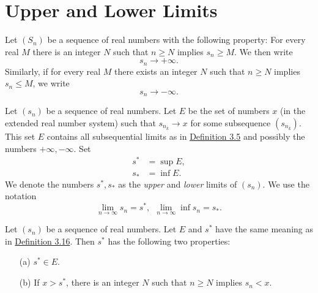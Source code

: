 \documentclass[11pt,a4paper]{book}
\begin{document}
\section{Upper and Lower Limits}

\begin{definition}[3.15]
    Let \( ({S}_{n}) \) be a sequence of real numbers with the following property: For every real \( M  \) there is an integer \( N \) such that \( n \geq N  \) implies \( {s}_{n} \geq M  \). We then write
    \[  {s}_{n} \to + \infty.  \]
    Similarly, if for every real \( M  \) there exists an integer \( N  \) such that \( n \geq N  \) implies \( {s}_{n} \leq M   \), we write
    \[  {s}_{n} \to -\infty.  \]
\end{definition}

\begin{definition}[3.16]\label{3.16}
    Let \( ({s}_{n}) \) be a sequence of real numbers. Let \( E  \) be the set of numbers \( x  \) (in the extended real number system) such that \( {s}_{{n}_{k}} \to x  \) for some subsequence \( ({s}_{{n}_{k}}) \). This set \( E  \) contains all subsequential limits as in {\hyperref[3.5]{Definition 3.5}} and possibly the numbers \( + \infty, - \infty   \). Set
    \begin{align*}
        s^{*} &= \sup E, \\
        {s}_{*} &= \inf E.
    \end{align*}
We denote the numbers \( s^{*}, {s}_{*} \) as the \textit{upper} and \textit{lower} limits of \( ({s}_{n}) \). We use the notation 
\[  \lim_{ n \to \infty  } {s}_{n} = s^{*}, \ \ \lim_{ n \to \infty  } \inf {s}_{n} = {s}_{*}. \]
\end{definition}

\begin{theorem}[3.17]
    Let \( ({s}_{n}) \) be a sequence of real numbers. Let \( E  \) and \( s^{*} \) have the same meaning as in {\hyperref[3.16]{Definition 3.16}}. Then \( s^{*}  \) has the following two properties:
    \begin{enumerate}
        \item[(a)] \( s^{*} \in E  \).
        \item[(b)] If \( x > s^{*} \), there is an integer \( N  \) such that \( n \geq N  \) implies \( {s}_{n} < x  \).
    \end{enumerate}
\end{theorem}
\end{document}
